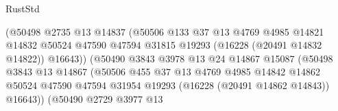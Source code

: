 \begin{lexlean}{RustStd}
\begin{coremodule}
                                          (@50498
                                            @2735
                                            @13
                                            @14837
                                            (@50506
                                              @133
                                              @37
                                              @13
                                              @4769
                                              @4985
                                              @14821
                                              @14832
                                              @50524
                                              @47590
                                              @47594
                                              @31815
                                              @19293
                                              (@16228 (@20491 @14832 @14822))
                                              @16643))
                                          (@50490
                                            @3843
                                            @3978
                                            @13
                                            @24
                                            @14867
                                            @15087
                                            (@50498
                                              @3843
                                              @13
                                              @14867
                                              (@50506
                                                @455
                                                @37
                                                @13
                                                @4769
                                                @4985
                                                @14842
                                                @14862
                                                @50524
                                                @47590
                                                @47594
                                                @31954
                                                @19293
                                                (@16228 (@20491 @14862 @14843))
                                                @16643))
                                            (@50490
                                              @2729
                                              @3977
                                              @13

\end{coremodule}
\end{lexlean}

